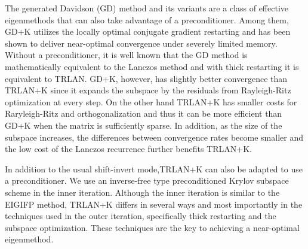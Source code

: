 \documentclass{report}
\begin{document}
The generated Davidson (GD) method and its variants are a class of
effective eigenmethods that can also take advantage of a preconditioner.
Among them, GD+K utilizes the locally optimal conjugate gradient
restarting and has been shown to deliver near-optimal convergence under
severely limited memory. Without a preconditioner, it is well known that
the GD method is mathematically equivalent to the Lanczos method and with
thick restarting it is equivalent to TRLAN. GD+K, however, has slightly
better convergence than TRLAN+K since it expands the subspace by the
residuals from Rayleigh-Ritz optimization at every step. On the other
hand TRLAN+K has smaller costs for Raryleigh-Ritz and orthogonalization
and thus it can be more efficient than GD+K when the matrix is
sufficiently sparse. In addition, as the size of the subspace increases,
the differences between convergence rates become smaller and the low cost
of the Lanczos recurrence further benefits TRLAN+K.

In addition to the usual shift-invert mode,TRLAN+K can also be adapted to
use a preconditioner. We use an inverse-free type preconditioned Krylov
subspace scheme in the inner iteration. Although the inner iteration is
similar to the EIGIFP method, TRLAN+K differs in several ways and most
importantly in the techniques used in the outer iteration, specifically
thick restarting and the subspace optimization. These techniques are the
key to achieving a near-optimal eigenmethod.
\end{document}
